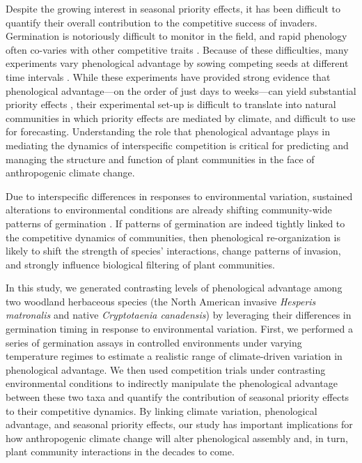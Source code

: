 \documentclass{article}[11pt]
\begin{document}
Despite the growing interest in seasonal priority effects, it has been difficult to quantify their overall contribution to the competitive success of invaders. Germination is notoriously difficult to monitor in the field, and rapid phenology often co-varies with other competitive traits \citep{Dickson2012,Milbau:2003vt,HAO:2009vh}. %
Because of these difficulties, many experiments vary phenological advantage by sowing competing seeds at different time intervals \citep{Young:2017aa}. While these experiments have provided strong evidence that phenological advantage---on the order of just days to weeks---can yield substantial priority effects \citep{Weidlich:2020aa}, their experimental set-up is difficult to translate into natural communities in which priority effects are mediated by climate, and difficult to use for forecasting. %
Understanding the role that phenological advantage plays in mediating the dynamics of interspecific competition is critical for predicting and managing the structure and function of plant communities in the face of anthropogenic climate change. 

Due  to interspecific differences in responses to environmental variation, sustained alterations to environmental conditions are already shifting community-wide patterns of germination \citep{Walck2011}. If patterns of germination are indeed tightly linked to the competitive dynamics of communities, then phenological re-organization is likely to shift the strength of species' interactions, change patterns of invasion, and strongly influence biological filtering of plant communities. 

In this study, we generated contrasting levels of phenological advantage among two woodland herbaceous species (the North American invasive \textit{Hesperis matronalis} and native \textit{Cryptotaenia canadensis}) by leveraging their differences in germination timing in response to environmental variation. First, we performed a series of germination assays in controlled environments under varying temperature regimes to estimate a realistic range of climate-driven variation in phenological advantage. %
We then used competition trials under contrasting environmental conditions to indirectly manipulate the phenological advantage between these two taxa and quantify the contribution of seasonal priority effects to their competitive dynamics. By linking climate variation, phenological advantage, and seasonal priority effects, our study has important implications for how anthropogenic climate change will alter phenological assembly and, in turn, plant community interactions in the decades to come.
\end{document}
